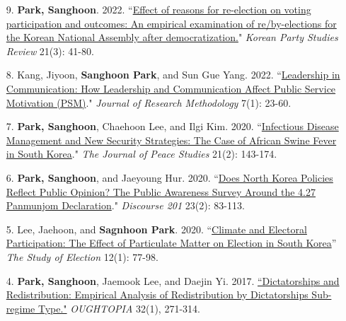 \documentclass[margin,line]{res}
\begin{document}
\begin{resume}
\begin{enumerate}[leftmargin=*]
\item[9.] \textbf{Park, Sanghoon}. 2022. ``\href{http://www.partystudies.or.kr/contents/bbs/bbs_list.html?bbs_cls_cd=004003}{Effect of reasons for re-election on voting participation and outcomes: An empirical examination of re/by-elections for the Korean National Assembly after democratization.}"  \textit{Korean Party Studies Review} 21(3): 41-80. 
\item[8.] Kang, Jiyoon, \textbf{Sanghoon Park}, and Sun Gue Yang. 2022. ``\href{http://basicdata.kr/board/read/journals/146/}{Leadership in Communication:
How Leadership and Communication Affect Public Service Motivation (PSM)}." \textit{Journal of Research Methodology} 7(1): 23-60.
\item[7.] \textbf{Park, Sanghoon}, Chaehoon Lee, and Ilgi Kim. 2020. ``\href{https://www.earticle.net/Journal/Issues/511/28448}{Infectious Disease Management and New Security Strategies: The Case of African Swine Fever in South Korea}." \textit{The Journal of Peace Studies} 21(2): 143-174.
\item[6.] \textbf{Park, Sanghoon}, and Jaeyoung Hur. 2020. ``\href{http://www.discourse201.org/html/sub05_01.asp}{Does North Korea Policies Reflect Public Opinion? The Public Awareness Survey Around the 4.27 Panmunjom Declaration}." \textit{Discourse 201} 23(2): 83-113.
\item[5.] Lee, Jaehoon, and \textbf{Sagnhoon Park}. 2020. ``\href{https://m.nec.go.kr/portal/cmm/fms/FileDown.do?atchFileId=5d0ffae936edc42f3b4e864801f86a0f4096c44da03fede418b94067e8f9d0ea&fileSn=1&bbsId=&searchYear=}{Climate and Electoral Participation: The Effect of Particulate Matter on Election in South Korea}'' \textit{The Study of Election} 12(1): 77-98.  
\item[4.] \textbf{Park, Sanghoon}, Jaemook Lee, and Daejin Yi. 2017. \href{http://www.dbpia.co.kr/Journal/ArticleDetail/NODE07183479?TotalCount=1&Seq=1&q=%5B%EB%8F%85%EC%9E%AC%EA%B5%AD%EA%B0%80%EC%99%80%20%EC%9E%AC%EB%B6%84%EB%B0%B0%C2%A7coldb%C2%A72%C2%A751%C2%A73%5D&searchWord=%EC%A0%84%EC%B2%B4%3D%5E%24%EB%8F%85%EC%9E%AC%EA%B5%AD%EA%B0%80%EC%99%80%20%EC%9E%AC%EB%B6%84%EB%B0%B0%5E*&Multimedia=0&isIdentifyAuthor=0&Collection=0&SearchAll=%EB%8F%85%EC%9E%AC%EA%B5%AD%EA%B0%80%EC%99%80%20%EC%9E%AC%EB%B6%84%EB%B0%B0&isFullText=0&specificParam=0&SearchMethod=0&Sort=1&SortType=desc&Page=1&PageSize=20#}{``Dictatorships and Redistribution: Empirical Analysis of Redistribution by Dictatorships Sub-regime Type."} \textit{OUGHTOPIA} 32(1), 271-314.

\end{enumerate}
\end{resume}
\end{document}
